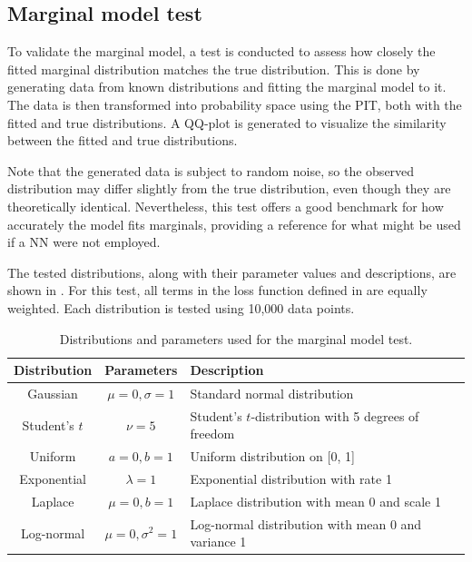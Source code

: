 \subsection{Marginal model test}
To validate the marginal model, a test is conducted to assess how closely the fitted marginal distribution matches the true distribution. This is done by generating data from known distributions and fitting the marginal model to it. The data is then transformed into probability space using the \gls{PIT}, both with the fitted and true distributions. A QQ-plot is generated to visualize the similarity between the fitted and true distributions. 

Note that the generated data is subject to random noise, so the observed distribution may differ slightly from the true distribution, even though they are theoretically identical. Nevertheless, this test offers a good benchmark for how accurately the model fits marginals, providing a reference for what might be used if a \gls{NN} were not employed.

The tested distributions, along with their parameter values and descriptions, are shown in . For this test, all terms in the loss function defined in  are equally weighted. Each distribution is tested using 10,000 data points.

\begin{table}[h]
    \centering
    \caption{Distributions and parameters used for the marginal model test.}
    \begin{tabular}{@{}ccl@{}}
        Distribution & Parameters & Description \\
        \toprule
        Gaussian & $\mu=0, \sigma=1$ & Standard normal distribution \\ 
        Student's $t$ & $\nu=5$ & Student's $t$-distribution with 5 degrees of freedom \\ 
        Uniform & $a=0, b=1$ & Uniform distribution on [0, 1] \\ 
        Exponential & $\lambda=1$ & Exponential distribution with rate 1 \\ 
        Laplace & $\mu=0, b=1$ & Laplace distribution with mean 0 and scale 1 \\ 
        Log-normal & $\mu=0, \sigma^2=1$ & Log-normal distribution with mean 0 and variance 1 \\ 
    \end{tabular}
    \label{tab:distributions}
\end{table}


